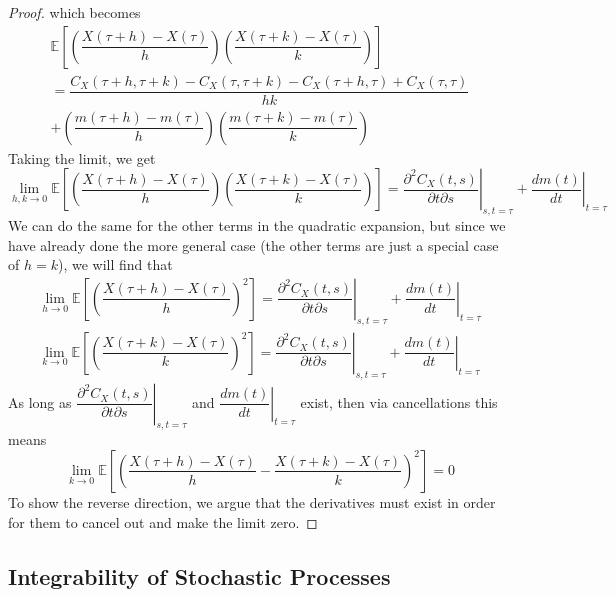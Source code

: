 \documentclass[11pt]{report} %
\begin{document}
\begin{proof}
which becomes
\begin{multline}
\mathbb{E}\left[\left(\dfrac{X\left(\tau+h\right)-X\left(\tau\right)}{h}\right)\left(\dfrac{X\left(\tau+k\right)-X\left(\tau\right)}{k}\right)\right] \\
= \dfrac{C_{X}\left(\tau+h,\tau+k\right)-C_{X}\left(\tau,\tau+k\right)-C_{X}\left(\tau+h,\tau\right)+C_{X}\left(\tau,\tau\right)}{hk} \\
+\left(\dfrac{m\left(\tau+h\right)-m\left(\tau\right)}{h}\right)\left(\dfrac{m\left(\tau+k\right)-m\left(\tau\right)}{k}\right)
\end{multline}
Taking the limit, we get
\begin{equation}
\lim_{h,k\to0}\mathbb{E}\left[\left(\dfrac{X\left(\tau+h\right)-X\left(\tau\right)}{h}\right)\left(\dfrac{X\left(\tau+k\right)-X\left(\tau\right)}{k}\right)\right]=\left.\dfrac{\partial^{2}C_{X}\left(t,s\right)}{\partial t\partial s}\right|_{s,t=\tau}+\left.\dfrac{dm\left(t\right)}{dt}\right|_{t=\tau}
\end{equation}
We can do the same for the other terms in the quadratic expansion, but since we have already done the more general case (the other terms are just a special case of $h = k$), we will find that
\begin{gather}
\lim_{h\to0}\mathbb{E}\left[\left(\dfrac{X\left(\tau+h\right)-X\left(\tau\right)}{h}\right)^{2}\right]=\left.\dfrac{\partial^{2}C_{X}\left(t,s\right)}{\partial t\partial s}\right|_{s,t=\tau}+\left.\dfrac{dm\left(t\right)}{dt}\right|_{t=\tau} \\
\lim_{k\to0}\mathbb{E}\left[\left(\dfrac{X\left(\tau+k\right)-X\left(\tau\right)}{k}\right)^{2}\right]=\left.\dfrac{\partial^{2}C_{X}\left(t,s\right)}{\partial t\partial s}\right|_{s,t=\tau}+\left.\dfrac{dm\left(t\right)}{dt}\right|_{t=\tau}
\end{gather}
As long as $\left.\dfrac{\partial^{2}C_{X}\left(t,s\right)}{\partial t\partial s}\right|_{s,t=\tau}$ and $\left.\dfrac{dm\left(t\right)}{dt}\right|_{t=\tau}$ exist, then via cancellations this means
\begin{equation}
\lim_{k\to0}\mathbb{E}\left[\left(\dfrac{X\left(\tau+h\right)-X\left(\tau\right)}{h}-\dfrac{X\left(\tau+k\right)-X\left(\tau\right)}{k}\right)^{2}\right]=0
\end{equation}
To show the reverse direction, we argue that the derivatives must exist in order for them to cancel out and make the limit zero.
\end{proof}

\subsection{Integrability of Stochastic Processes}
\end{document}
